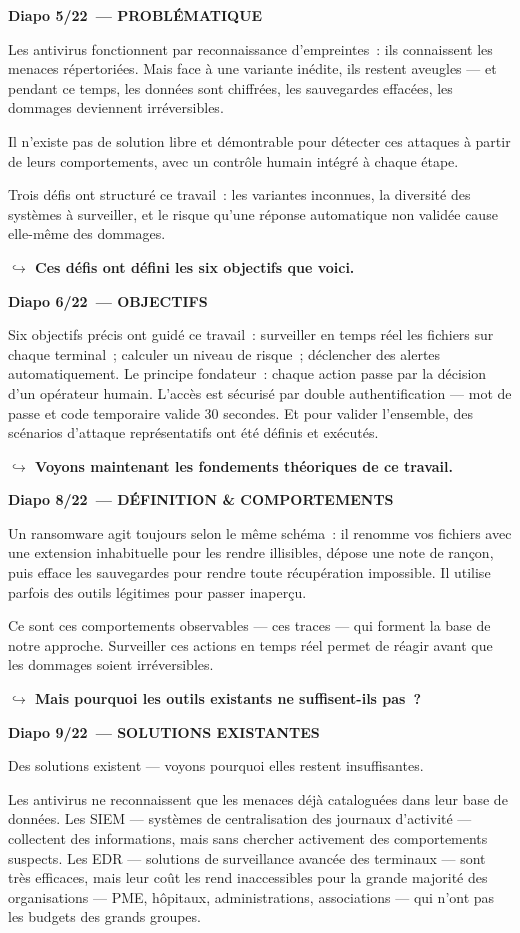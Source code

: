 \documentclass[a4paper,11pt]{article}
\newcommand{\notehead}[2]{%
  \par\vspace{14pt}%
  {\color{white}\colorbox{primary}{\parbox{\dimexpr\linewidth-12pt}{\vspace{3pt}%
    \bfseries\large Diapo #1~--- #2\vspace{3pt}}}}%
  \par\vspace{6pt}%
}
\newcommand{\pivot}[1]{%
  \par\vspace{3pt}%
  {\color{transition}\small\bfseries $\hookrightarrow$ #1}%
}
\begin{document}
\notehead{5/22}{PROBLÉMATIQUE}
Les antivirus fonctionnent par reconnaissance d'empreintes~: ils connaissent les menaces répertoriées.
  Mais face à une variante inédite, ils restent aveugles --- et pendant ce temps, les données sont
  chiffrées, les sauvegardes effacées, les dommages deviennent irréversibles.

Il n'existe pas de solution libre et démontrable pour détecter ces attaques à partir de leurs
  comportements, avec un contrôle humain intégré à chaque étape.

Trois défis ont structuré ce travail~: les variantes inconnues, la diversité des systèmes à surveiller,
  et le risque qu'une réponse automatique non validée cause elle-même des dommages.
\pivot{Ces défis ont défini les six objectifs que voici.}

\notehead{6/22}{OBJECTIFS}
Six objectifs précis ont guidé ce travail~: surveiller en temps réel les fichiers sur chaque
  terminal~; calculer un niveau de risque~; déclencher des alertes automatiquement. Le principe
  fondateur~: chaque action passe par la décision d'un opérateur humain. L'accès est sécurisé
  par double authentification --- mot de passe et code temporaire valide 30 secondes. Et pour
  valider l'ensemble, des scénarios d'attaque représentatifs ont été définis et exécutés.
\pivot{Voyons maintenant les fondements théoriques de ce travail.}

\notehead{8/22}{DÉFINITION \& COMPORTEMENTS}
Un ransomware agit toujours selon le même schéma~: il renomme vos fichiers avec une extension
  inhabituelle pour les rendre illisibles, dépose une note de rançon, puis efface les sauvegardes
  pour rendre toute récupération impossible. Il utilise parfois des outils légitimes pour passer
  inaperçu.

Ce sont ces comportements observables --- ces traces --- qui forment la base de notre approche.
  Surveiller ces actions en temps réel permet de réagir avant que les dommages soient irréversibles.
\pivot{Mais pourquoi les outils existants ne suffisent-ils pas~?}

\notehead{9/22}{SOLUTIONS EXISTANTES}
Des solutions existent --- voyons pourquoi elles restent insuffisantes.

Les antivirus ne reconnaissent que les menaces déjà cataloguées dans leur base de données. Les
  SIEM --- systèmes de centralisation des journaux d'activité --- collectent des informations, mais
  sans chercher activement des comportements suspects. Les EDR --- solutions de surveillance avancée
  des terminaux --- sont très efficaces, mais leur coût les rend inaccessibles pour la grande majorité
  des organisations --- PME, hôpitaux, administrations, associations --- qui n'ont pas les budgets
  des grands groupes.
\end{document}
